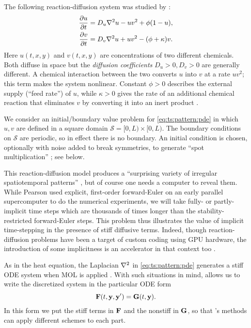 The following reaction-diffusion system was studied by \citep{Pearson1993}:
\begin{align}
\frac{\partial u}{\partial t} &= D_u \nabla^2 u - u v^2 + \phi (1 - u), \label{eq:ts:pattern:pde} \\
\frac{\partial v}{\partial t} &= D_v \nabla^2 u + u v^2 - (\phi + \kappa) v. \notag
\end{align}
Here $u(t,x,y)$ and $v(t,x,y)$ are concentrations of two different chemicals.  Both diffuse in space but the \emph{diffusion coefficients} $D_u>0,D_v>0$ are generally different.  A chemical interaction between the two converts $u$ into $v$ at a rate $u v^2$; this term makes the system nonlinear.  Constant $\phi>0$ describes the external supply (``feed rate'') of $u$, while $\kappa>0$ gives the rate of an additional chemical reaction that eliminates $v$ by converting it into an inert product \citep{Pearson1993}.

We consider an initial/boundary value problem for \eqref{eq:ts:pattern:pde} in which $u,v$ are defined in a square domain $\mathcal{S} = [0,L)\times [0,L)$.  The boundary conditions on $\mathcal{S}$ are periodic, so in effect there is no boundary.  An initial condition is chosen, optionally with noise added to break symmetries, to generate ``spot multiplication'' \citep{HundsdorferVerwer2003,Pearson1993}; see below.

This reaction-diffusion model produces a ``surprising variety of irregular spatiotemporal patterns'' \citep{Pearson1993}, but of course one needs a computer to reveal them.  While Pearson used explicit, first-order forward-Euler on an early parallel supercomputer to do the numerical experiments, we will take fully- or partly-implicit time steps which are thousands of times longer than the stability-restricted forward-Euler steps.  This problem thus illustrates the value of implicit time-stepping in the presence of stiff diffusive terms.  Indeed, though reaction-diffusion problems have been a target of custom coding using GPU hardware, the introduction of some implicitness is an accelerator in that context too \citep{Sandersonetal2009}.

As in the heat equation, the Laplacian $\nabla^2$ in \eqref{eq:ts:pattern:pde} generates a stiff ODE system when MOL is applied \citep{HundsdorferVerwer2003}.  With such situations in mind, \PETSc allows us to write the discretized system in the particular ODE form
\begin{equation}
\mathbf{F}(t,\mathbf{y},\mathbf{y}') = \mathbf{G}(t,\mathbf{y}). \label{eq:ts:pattern:imexform}
\end{equation}
In this form we put the stiff terms in $\mathbf{F}$ and the nonstiff in $\mathbf{G}$, so that \PETSc's methods can apply different schemes to each part.

